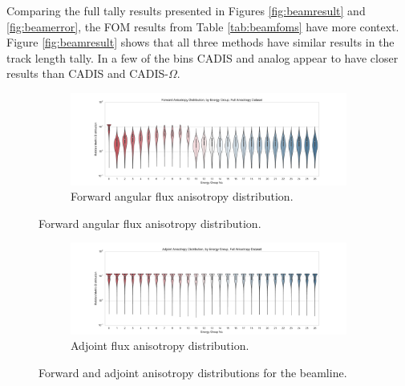 Comparing the full tally results presented in Figures \ref{fig:beamresult} and
\ref{fig:beamerror}, the FOM results from Table \ref{tab:beamfoms} have more
context. Figure \ref{fig:beamresult} shows that all three methods have similar
results in the track length tally. In a few of the bins CADIS and 
analog appear to have closer results than CADIS and CADIS-$\Omega$.

\begin{figure}[htb!]
  \centering
  \begin{subfigure}[t]{\textwidth}
    \includegraphics[width=\linewidth]{./chapters/characterization_probs/figures/char/beam/forward_anisotropy_violin_full.pdf}
    \caption{Forward angular flux anisotropy distribution.}
    \label{fig:forwardbeamline}
  \end{subfigure}
\end{figure}
\begin{figure}[htb!]\ContinuedFloat
  \centering
  \begin{subfigure}[t]{\textwidth}
    \includegraphics[width=\linewidth]{./chapters/characterization_probs/figures/char/beam/adjoint_anisotropy_violin_full.pdf}
    \caption{Adjoint flux anisotropy distribution.}
    \label{fig:adjointbeamline}
  \end{subfigure}
  \caption[Forward and adjoint anisotropy distributions for experimental
  nuclear physics beamline]{Forward and adjoint anisotropy distributions for
  the beamline.}
  \label{fig:beamlineplots}
\end{figure}

